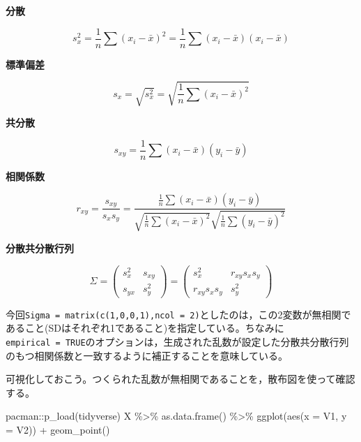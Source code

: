 \documentclass[
  a4paper,
]{ltjsbook}
\newenvironment{Shaded}{\begin{snugshade}}{\end{snugshade}}
\newcommand{\AttributeTok}[1]{\textcolor[rgb]{0.40,0.45,0.13}{#1}}
\newcommand{\FunctionTok}[1]{\textcolor[rgb]{0.28,0.35,0.67}{#1}}
\newcommand{\NormalTok}[1]{\textcolor[rgb]{0.00,0.23,0.31}{#1}}
\newcommand{\SpecialCharTok}[1]{\textcolor[rgb]{0.37,0.37,0.37}{#1}}
\begin{document}
\textbf{分散}

\[ s_x^2 = \frac{1}{n}\sum (x_i - \bar{x})^2 =  \frac{1}{n}\sum (x_i - \bar{x})(x_i - \bar{x})\]

\textbf{標準偏差}

\[ s_x = \sqrt{s_x^2} = \sqrt{\frac{1}{n}\sum (x_i - \bar{x})^2}\]

\textbf{共分散}

\[ s_{xy} = \frac{1}{n}\sum (x_i - \bar{x})(y_i - \bar{y})\]

\textbf{相関係数}

\[r_{xy} = \frac{s_{xy}}{s_xs_y} = \frac{\frac{1}{n}\sum (x_i - \bar{x})(y_i - \bar{y})}{\sqrt{\frac{1}{n}\sum (x_i - \bar{x})^2}\sqrt{\frac{1}{n}\sum (y_i - \bar{y})^2}}\]

\textbf{分散共分散行列}

\[\Sigma = \begin{pmatrix} s_x^2 & s_{xy} \\ s_{yx} & s_y^2 \end{pmatrix}
= \begin{pmatrix} s_x^2 & r_{xy}s_xs_y \\ r_{xy}s_xs_y & s_y^2 \end{pmatrix}\]

今回\texttt{Sigma\ =\ matrix(c(1,0,0,1),ncol\ =\ 2)}としたのは，この2変数が無相関であること(SDはそれぞれ1であること)を指定している。ちなみに\texttt{empirical\ =\ TRUE}のオプションは，生成された乱数が設定した分散共分散行列のもつ相関係数と一致するように補正することを意味している。

可視化しておこう。つくられた乱数が無相関であることを，散布図を使って確認する。

\begin{Shaded}
\begin{Highlighting}[]
\NormalTok{pacman}\SpecialCharTok{::}\FunctionTok{p\_load}\NormalTok{(tidyverse)}
\NormalTok{X }\SpecialCharTok{\%\textgreater{}\%}
  \FunctionTok{as.data.frame}\NormalTok{() }\SpecialCharTok{\%\textgreater{}\%}
  \FunctionTok{ggplot}\NormalTok{(}\FunctionTok{aes}\NormalTok{(}\AttributeTok{x =}\NormalTok{ V1, }\AttributeTok{y =}\NormalTok{ V2)) }\SpecialCharTok{+}
  \FunctionTok{geom\_point}\NormalTok{()}
\end{Highlighting}
\end{Shaded}
\end{document}
